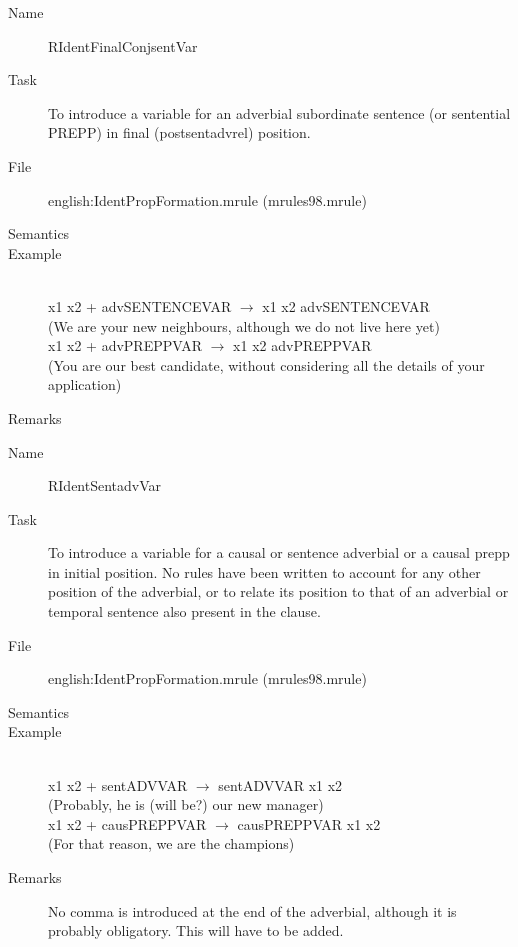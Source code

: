 \begin{description}
\vspace{1 cm}
\begin{description}
\item[Name] RIdentFinalConjsentVar
\item[Task] To introduce a variable for an adverbial subordinate sentence (or 
sentential PREPP) in final (postsentadvrel) position.
\item[File] english:IdentPropFormation.mrule (mrules98.mrule)
\item[Semantics]
\item[Example] \mbox{}\\
x1 x2 + advSENTENCEVAR $\rightarrow$ x1 x2 advSENTENCEVAR \\
(We are your new neighbours, although we do not live here yet)\\
x1 x2 + advPREPPVAR $\rightarrow$ x1 x2 advPREPPVAR \\
(You are our best candidate, without considering all the details of your 
application)
\item[Remarks] 
\end{description}

\vspace{1 cm}
\begin{description}
\item[Name] RIdentSentadvVar
\item[Task] To introduce a variable for a causal or sentence adverbial or a 
causal prepp in 
initial position. No rules have been written to account for any other position 
of the adverbial, or to relate its position to that of an adverbial or temporal 
sentence also present in the clause.
\item[File] english:IdentPropFormation.mrule (mrules98.mrule)
\item[Semantics]
\item[Example] \mbox{}\\
x1 x2 + sentADVVAR $\rightarrow$ sentADVVAR x1 x2\\
(Probably, he is (will be?) our new manager)\\
x1 x2 + causPREPPVAR $\rightarrow$ causPREPPVAR x1 x2\\
(For that reason, we are the champions)
\item[Remarks] No comma is introduced at the end of the adverbial, 
although it is probably obligatory. This will have to be added.
\end{description}

\end{description}

